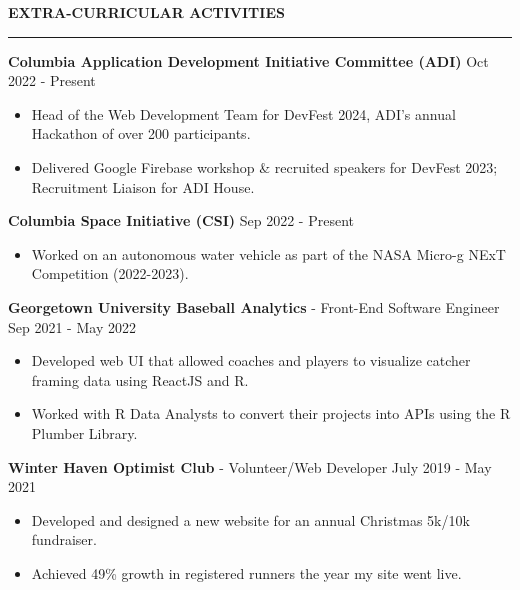 \documentclass[10pt,letterpaper]{article}
\begin{document}
\medskip
\MakeUppercase{{\bf Extra-Curricular Activities}}
\medskip
\hrule
\begin{list}{}{\setlength{\leftmargin}{0em}}
    \item
          \textbf{Columbia Application Development Initiative Committee (ADI)} \hfill Oct 2022 - Present
          \begin{itemize}
              \item Head of the Web Development Team for DevFest 2024, ADI's annual Hackathon of over 200 participants.  \
              \item Delivered Google Firebase workshop \& recruited speakers for DevFest 2023; Recruitment Liaison for ADI House.
          \end{itemize}
    \item
          \textbf{Columbia Space Initiative (CSI)} \hfill Sep 2022 - Present
          \begin{itemize}
              \item Worked on an autonomous water vehicle as part of the NASA Micro-g NExT Competition (2022-2023).
          \end{itemize}
    \item
          \textbf{Georgetown University Baseball Analytics} - Front-End Software Engineer \hfill Sep 2021 - May 2022
          \begin{itemize}
              \item Developed web UI that allowed coaches and players to visualize catcher framing data using ReactJS and R. \
              \item Worked with R Data Analysts to convert their projects into APIs using the R Plumber Library.
          \end{itemize}

    \item
          \textbf{Winter Haven Optimist Club} - Volunteer/Web Developer \hfill July 2019 - May 2021
          \begin{itemize}
              \item Developed and designed a new website for an annual Christmas 5k/10k fundraiser.
              \item Achieved 49\% growth in registered runners the year my site went live.
          \end{itemize}
\end{list}


\end{document}
